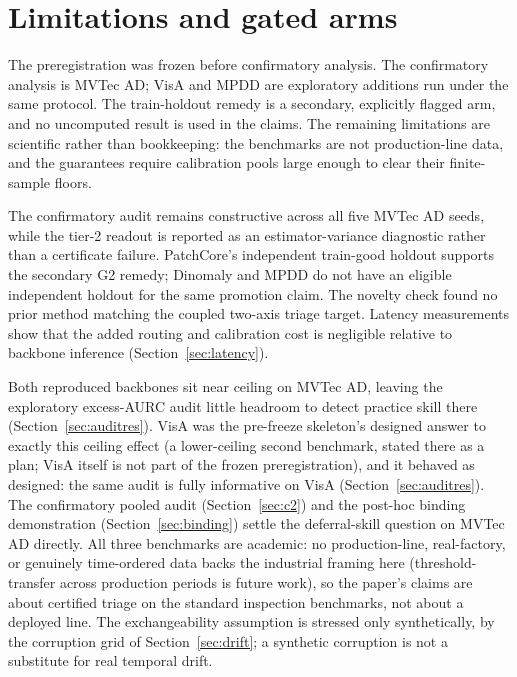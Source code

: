 \documentclass[preprint,11pt]{elsarticle}
\begin{document}
\section{Limitations and gated arms}
\label{sec:limitations}

The preregistration was frozen before confirmatory analysis. The confirmatory analysis is MVTec AD;
VisA and MPDD are exploratory additions run under the same protocol. The train-holdout
remedy is a secondary, explicitly flagged arm, and no uncomputed result is used in the claims.
The remaining limitations are scientific rather than bookkeeping: the benchmarks are not
production-line data, and the guarantees require calibration pools large enough to clear their
finite-sample floors.

The confirmatory audit remains constructive across all five MVTec AD seeds, while the tier-2
readout is reported as an estimator-variance diagnostic rather than a certificate failure.
PatchCore's independent train-good holdout supports the secondary G2 remedy; Dinomaly and
MPDD do not have an eligible independent holdout for the same promotion claim. The novelty
check found no prior method matching the coupled two-axis triage target. Latency measurements
show that the added routing and calibration cost is negligible relative to backbone inference
(Section~\ref{sec:latency}).

Both reproduced backbones sit near ceiling on MVTec AD, leaving the exploratory excess-AURC
audit little headroom to detect practice skill there (Section~\ref{sec:auditres}). VisA was the
pre-freeze skeleton's designed answer to exactly this ceiling effect (a lower-ceiling second
benchmark, stated there as a plan; VisA itself is not part of the frozen preregistration), and
it behaved as designed: the same audit is fully informative on VisA
(Section~\ref{sec:auditres}). The confirmatory pooled audit (Section~\ref{sec:c2}) and the
post-hoc binding demonstration (Section~\ref{sec:binding}) settle the deferral-skill question on
MVTec AD directly. All three benchmarks are academic: no production-line, real-factory, or
genuinely time-ordered data backs the industrial framing here (threshold-transfer across
production periods is future work), so the paper's claims are about certified triage on the
standard inspection benchmarks, not about a deployed line. The exchangeability assumption is
stressed only synthetically, by the corruption grid of Section~\ref{sec:drift}; a synthetic
corruption is not a substitute for real temporal drift.
\end{document}
